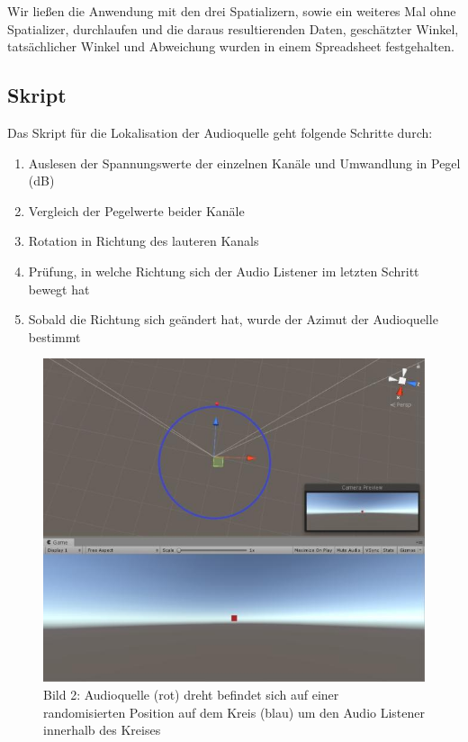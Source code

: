 \documentclass[12pt,a4paper]{article}
\begin{document}
Wir ließen die Anwendung mit den drei Spatializern, sowie ein weiteres Mal ohne Spatializer, durchlaufen und die daraus resultierenden Daten, geschätzter Winkel, tatsächlicher Winkel und Abweichung wurden in einem Spreadsheet festgehalten.

\subsection{Skript}
Das Skript für die Lokalisation der Audioquelle geht folgende Schritte durch:
\begin{enumerate}
\item Auslesen der Spannungswerte der einzelnen Kanäle und Umwandlung in Pegel (dB)
\item Vergleich der Pegelwerte beider Kanäle
\item Rotation in Richtung des lauteren Kanals
\item Prüfung, in welche Richtung sich der Audio Listener im letzten Schritt bewegt hat
\item Sobald die Richtung sich geändert hat, wurde der Azimut der Audioquelle bestimmt
\end{enumerate}

\begin{figure}[h!]
\centering
\includegraphics[scale=0.5]{setup1}
\caption{Bild 2: Audioquelle (rot) dreht befindet sich auf einer randomisierten Position auf dem Kreis (blau) um den Audio Listener innerhalb des Kreises}
\end{figure}
\end{document}
